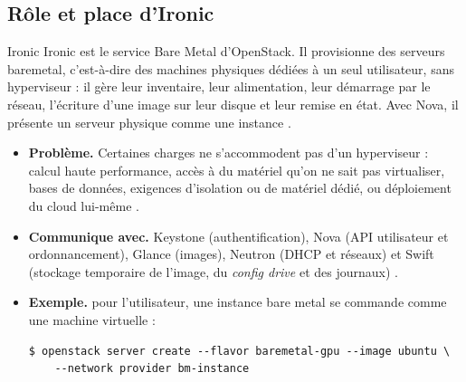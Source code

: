 \subsection{Rôle et place d'Ironic}\label{sec:ir-role}

\begin{definition}{Ironic}
Ironic est le service Bare Metal d'OpenStack. Il provisionne des serveurs \gls{baremetal}, c'est-à-dire des machines physiques
dédiées à un seul utilisateur, sans hyperviseur : il gère leur inventaire, leur alimentation, leur démarrage par le réseau,
l'écriture d'une image sur leur disque et leur remise en état. Avec Nova, il présente un serveur physique comme une instance
\parencite{ironic-overview}.
\end{definition}

\begin{itemize}
  \item \textbf{Problème.} Certaines charges ne s'accommodent pas d'un hyperviseur : calcul haute performance, accès à du
        matériel qu'on ne sait pas virtualiser, bases de données, exigences d'isolation ou de matériel dédié, ou déploiement du
        cloud lui-même \parencite{ironic-overview}.
  \item \textbf{Communique avec.} Keystone (authentification), Nova (API utilisateur et ordonnancement), Glance (images),
        Neutron (DHCP et réseaux) et Swift (stockage temporaire de l'image, du \emph{config drive} et des journaux)
        \parencite{ironic-overview}.
  \item \textbf{Exemple.} pour l'utilisateur, une instance bare metal se commande comme une machine virtuelle :
\begin{lstlisting}[style=terminal]
$ openstack server create --flavor baremetal-gpu --image ubuntu \
    --network provider bm-instance
\end{lstlisting}
\end{itemize}

